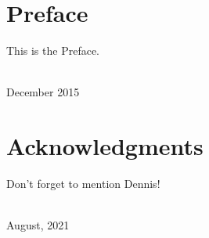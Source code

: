 \clearpage
 
 
 
 
\blankpage

{
\chapter*{Preface}
\thispagestyle{plain}

\noindent
This is the Preface.


\vspace*{2pc}
\noindent\AUTHORS\\
\noindent December 2015
}

\clearpage




\blankpage

\chapter*{Acknowledgments}
\thispagestyle{plain}

\noindent
Don't forget to mention Dennis!

\vspace*{2pc}
\noindent\AUTHORS\\
\noindent August, 2021
 
\clearpage

\blankpage

